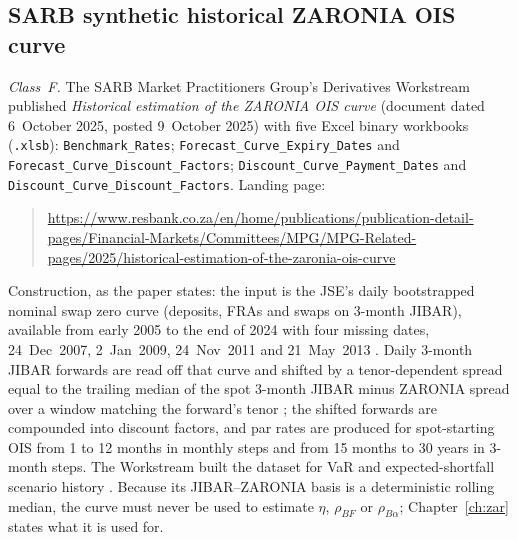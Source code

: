 

\subsection{SARB synthetic historical ZARONIA OIS curve}\label{sec:appC-synthetic}

\emph{Class~F.} The SARB Market Practitioners Group's Derivatives Workstream published \emph{Historical estimation of the ZARONIA OIS curve} (document dated 6~October 2025, posted 9~October 2025) \citep[\S1, p.~4]{sarb2025ois} with five Excel binary workbooks (\texttt{.xlsb}): \texttt{Benchmark\_Rates}; \texttt{Forecast\_Curve\_Expiry\_Dates} and \texttt{Forecast\_Curve\_\allowbreak Discount\_Factors}; \texttt{Discount\_Curve\_Payment\_Dates} and \texttt{Discount\_Curve\_\allowbreak Discount\_Factors}. Landing page:
\begin{quote}\footnotesize\raggedright\url{https://www.resbank.co.za/en/home/publications/publication-detail-pages/Financial-Markets/Committees/MPG/MPG-Related-pages/2025/historical-estimation-of-the-zaronia-ois-curve}
\end{quote}
Construction, as the paper states: the input is the JSE's daily bootstrapped nominal swap zero curve (deposits, FRAs and swaps on 3-month JIBAR), available from early 2005 to the end of 2024 \citep[\S2, p.~4]{sarb2025ois} with four missing dates, 24~Dec~2007, 2~Jan~2009, 24~Nov~2011 and 21~May~2013 \citep[\S2, fn.~2, p.~4]{sarb2025ois}. Daily 3-month JIBAR forwards are read off that curve and shifted by a tenor-dependent spread equal to the trailing median of the spot 3-month JIBAR minus ZARONIA spread over a window matching the forward's tenor \citep[\S3, p.~6]{sarb2025ois}; the shifted forwards are compounded into discount factors, and par rates are produced for spot-starting OIS from 1 to 12 months in monthly steps and from 15 months to 30 years in 3-month steps. The Workstream built the dataset for VaR and expected-shortfall scenario history \citep[\S1, p.~4]{sarb2025ois}. Because its JIBAR--ZARONIA basis is a deterministic rolling median, the curve must never be used to estimate $\eta$, $\rho_{BF}$ or $\rho_{B\alpha}$; Chapter~\ref{ch:zar} states what it is used for.

